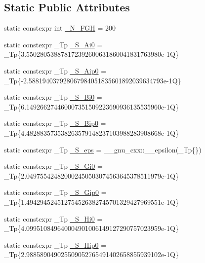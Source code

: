 \subsection*{Static Public Attributes}
\begin{DoxyCompactItemize}
\item 
static constexpr int \hyperlink{classstd_1_1____detail_1_1__Airy__series_a01e903f238d8c10c82cea4c115612ad8}{\+\_\+\+N\+\_\+\+F\+GH} = 200
\item 
static constexpr \+\_\+\+Tp \hyperlink{classstd_1_1____detail_1_1__Airy__series_a530108939a1c52d530e1d2ff577195b2}{\+\_\+\+S\+\_\+\+Ai0} = \+\_\+\+Tp\{3.\+550280538878172392600631860041831763980e-\/1\+Q\}
\item 
static constexpr \+\_\+\+Tp \hyperlink{classstd_1_1____detail_1_1__Airy__series_a9a0a96224f581add2488a885f08c810f}{\+\_\+\+S\+\_\+\+Aip0} = \+\_\+\+Tp\{-\/2.\+588194037928067984051835601892039634793e-\/1\+Q\}
\item 
static constexpr \+\_\+\+Tp \hyperlink{classstd_1_1____detail_1_1__Airy__series_a9ad4abe8477f8b28acc85d305f378f82}{\+\_\+\+S\+\_\+\+Bi0} = \+\_\+\+Tp\{6.\+149266274460007351509223690936135535960e-\/1\+Q\}
\item 
static constexpr \+\_\+\+Tp \hyperlink{classstd_1_1____detail_1_1__Airy__series_a153d931f593516a030505f7fd96845e7}{\+\_\+\+S\+\_\+\+Bip0} = \+\_\+\+Tp\{4.\+482883573538263579148237103988283908668e-\/1\+Q\}
\item 
static constexpr \+\_\+\+Tp \hyperlink{classstd_1_1____detail_1_1__Airy__series_aeeb50187c007e2436a80dde35250cabd}{\+\_\+\+S\+\_\+eps} = \+\_\+\+\_\+gnu\+\_\+cxx\+::\+\_\+\+\_\+epsilon(\+\_\+\+Tp\{\})
\item 
static constexpr \+\_\+\+Tp \hyperlink{classstd_1_1____detail_1_1__Airy__series_a1ffe2a989d5ab598db201c77d08dc96d}{\+\_\+\+S\+\_\+\+Gi0} = \+\_\+\+Tp\{2.\+049755424820002450503074563645378511979e-\/1\+Q\}
\item 
static constexpr \+\_\+\+Tp \hyperlink{classstd_1_1____detail_1_1__Airy__series_aa2269595bf85d349e9e5a1e6e4abb1a4}{\+\_\+\+S\+\_\+\+Gip0} = \+\_\+\+Tp\{1.\+494294524512754526382745701329427969551e-\/1\+Q\}
\item 
static constexpr \+\_\+\+Tp \hyperlink{classstd_1_1____detail_1_1__Airy__series_a9968426a52459123041f5fc11d73a854}{\+\_\+\+S\+\_\+\+Hi0} = \+\_\+\+Tp\{4.\+099510849640004901006149127290757023959e-\/1\+Q\}
\item 
static constexpr \+\_\+\+Tp \hyperlink{classstd_1_1____detail_1_1__Airy__series_a848fb790433db9dc427f9dd37a33da39}{\+\_\+\+S\+\_\+\+Hip0} = \+\_\+\+Tp\{2.\+988589049025509052765491402658855939102e-\/1\+Q\}

\end{DoxyCompactItemize}
